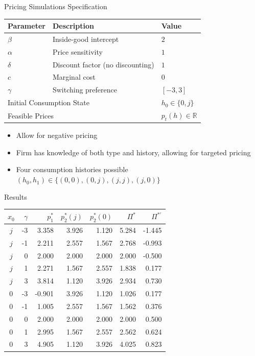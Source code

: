 \documentclass[aspectratio=169,professionalfonts]{beamer}
\begin{document}
\begin{frame}{Pricing Simulations Specification}
  \centering
  \small
  \begin{tabular}{lll}
    \toprule
    Parameter & Description & Value \\
    \midrule
    $\beta$ & Inside-good intercept & $2$ \\
    $\alpha$ & Price sensitivity & $1$ \\
    $\delta$ & Discount factor (no discounting) & $1$ \\
    $c$ & Marginal cost & $0$ \\
    $\gamma$ & Switching preference & $[-3,3]$ \\
    \midrule
    \multicolumn{2}{l}{Initial Consumption State}
      & $h_0\in\{0,j\}$ \\
    \multicolumn{2}{l}{Feasible Prices}
      & $p_t(h)\in\mathbb{R}$ \\
    \bottomrule
  \end{tabular}
  \begin{itemize}
    \item Allow for negative pricing
    \item Firm has knowledge of both type and history, allowing for targeted pricing
    \item Four consumption histories possible $(h_0, h_1) \in \{(0,0), (0,j), (j,j), (j,0)\}$
  \end{itemize}
\end{frame}
\begin{frame}{Results}
  \begin{center}\small\begin{tabular}{crrrrrr}\toprule
  $x_0$ & $\gamma$ & $p_1^*$ & $p_2^*(j)$ & $p_2^*(0)$ & $\Pi^*$ & $\Pi^{*\prime}$\\\midrule
  $j$ & -3 & 3.358 & 3.926 & 1.120 & 5.284 & -1.445\\
  $j$ & -1 & 2.211 & 2.557 & 1.567 & 2.768 & -0.993\\
  $j$ & 0 & 2.000 & 2.000 & 2.000 & 2.000 & -0.500\\
  $j$ & 1 & 2.271 & 1.567 & 2.557 & 1.838 & 0.177\\
  $j$ & 3 & 3.814 & 1.120 & 3.926 & 2.934 & 0.730\\
  $0$ & -3 & -0.901 & 3.926 & 1.120 & 1.026 & 0.177\\
  $0$ & -1 & 1.005 & 2.557 & 1.567 & 1.562 & 0.376\\
  $0$ & 0 & 2.000 & 2.000 & 2.000 & 2.000 & 0.500\\
  $0$ & 1 & 2.995 & 1.567 & 2.557 & 2.562 & 0.624\\
  $0$ & 3 & 4.905 & 1.120 & 3.926 & 4.025 & 0.823\\
  \bottomrule\end{tabular}\end{center}
\end{frame}
\end{document}

